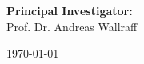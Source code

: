 \begin{titlepage}
\begin{center}
        \vspace{0.3cm}
        \textbf{Principal Investigator:} \\
        Prof. Dr. Andreas Wallraff
    \end{center}

    \vspace{0.5cm}

    \begin{center}
        \today
    \end{center}
\end{titlepage}